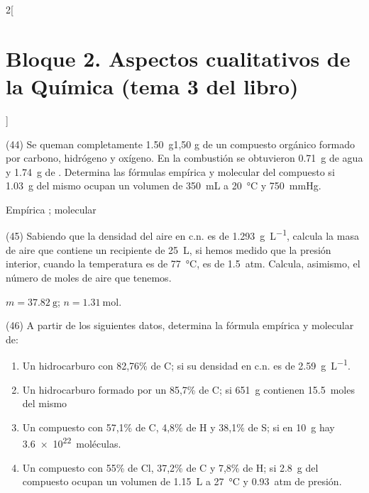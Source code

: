 \documentclass[10pt]{article}
\begin{document}
\begin{multicols}{2}[
    \section{Bloque 2. Aspectos cualitativos de la Química (tema 3 del libro)}
  ]
\begin{exercise}[
    tags    = {},
    topics  = {química,química básica},
    source  = {FQ 1B MGH 2016, p85, e26},
  ]
  (44) Se queman completamente \SI{1.50}{\gram}1,50 g de un compuesto orgánico
  formado por carbono, hidrógeno y oxígeno. En la combustión
  se obtuvieron \SI{0.71}{\gram} de agua y \SI{1.74}{\gram} de . Determina las fórmulas empírica y molecular del compuesto si
  \SI{1.03}{\gram} del mismo ocupan un volumen de \SI{350}{\milli\liter} a \SI{20}{\celsius} y \SI{750}{\mmHg}.
\end{exercise}

\begin{solution}
  Empírica ; molecular 
\end{solution}





\begin{exercise}[
    tags    = {},
    topics  = {química,química básica},
    source  = {FQ 1B MGH 2016, p85, e26},
  ]

  (45) Sabiendo que la densidad del aire en c.n. es de \SI{1.293}{\gram\per\liter}, calcula la masa de aire que contiene un recipiente de \SI{25}{\liter}, si hemos medido que la presión interior, cuando la temperatura es de \SI{77}{\celsius}, es de \SI{1.5}{atm}. Calcula, asimismo, el número de moles de aire que tenemos.
\end{exercise}

\begin{solution}
  \( m = \SI{37.82}{\gram} \); \( n = \SI{1.31}{\mole} \).
\end{solution}





\begin{exercise}[
    tags    = {},
    topics  = {química,química básica},
    source  = {FQ 1B MGH 2016, p85, e26},
  ]

  (46) A partir de los siguientes datos, determina la fórmula empírica y molecular de:

  \begin{enumerate}
    \item Un hidrocarburo con 82,76\% de C; si su densidad en c.n. es de \SI{2.59}{\gram\per\liter}.
    \item Un hidrocarburo formado por un 85,7\% de C; si \SI{651}{\gram} contienen \SI{15.5}{moles} del mismo
    \item Un compuesto con 57,1\% de C, 4,8\% de H y 38,1\% de S; si en \SI{10}{\gram} hay \SI{3.6e22}{moléculas}.
    \item Un compuesto con 55\% de Cl, 37,2\% de C y 7,8\% de H; si \SI{2.8}{\gram} del compuesto ocupan un volumen de \SI{1.15}{\liter} a \SI{27}{\celsius} y \SI{0.93}{atm} de presión.
  \end{enumerate}
\end{exercise}


\end{multicols}
\end{document}
